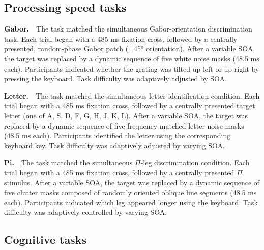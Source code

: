 \documentclass[
  ,man]{apa6}
\begin{document}
\subsection{Processing speed tasks}\label{processing-speed-tasks}

\textbf{Gabor.}\(\quad\)The task matched the simultaneous Gabor-orientation discrimination task. Each trial began with a 485 ms fixation cross, followed by a centrally presented, random-phase Gabor patch (±45° orientation). After a variable SOA, the target was replaced by a dynamic sequence of five white noise masks (48.5 ms each). Participants indicated whether the grating was tilted up-left or up-right by pressing the keyboard. Task difficulty was adaptively adjusted by SOA.

\textbf{Letter.}\(\quad\)The task matched the simultaneous letter-identification condition. Each trial began with a 485 ms fixation cross, followed by a centrally presented target letter (one of A, S, D, F, G, H, J, K, L). After a variable SOA, the target was replaced by a dynamic sequence of five frequency-matched letter noise masks (48.5 ms each). Participants identified the letter using the corresponding keyboard key. Task difficulty was adaptively adjusted by varying SOA.

\textbf{Pi.}\(\quad\)The task matched the simultaneous \(\Pi\)-leg discrimination condition. Each trial began with a 485 ms fixation cross, followed by a centrally presented \(\Pi\) stimulus. After a variable SOA, the target was replaced by a dynamic sequence of five clutter masks composed of randomly oriented oblique line segments (48.5 ms each). Participants indicated which leg appeared longer using the keyboard. Task difficulty was adaptively controlled by varying SOA.

\subsection{Cognitive tasks}\label{cognitive-tasks}
\end{document}
